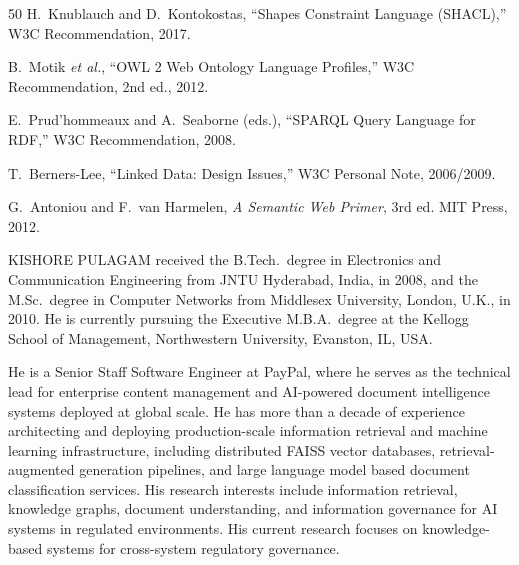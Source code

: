 \documentclass{ieeeaccess}
\begin{document}
\begin{thebibliography}{50}
H.~Knublauch and D.~Kontokostas, ``Shapes Constraint Language (SHACL),'' W3C Recommendation, 2017.

B.~Motik \textit{et al.}, ``OWL 2 Web Ontology Language Profiles,'' W3C Recommendation, 2nd ed., 2012.


E.~Prud'hommeaux and A.~Seaborne (eds.), ``SPARQL Query Language for RDF,'' W3C Recommendation, 2008.

T.~Berners-Lee, ``Linked Data: Design Issues,'' W3C Personal Note, 2006/2009.

G.~Antoniou and F.~van Harmelen, \textit{A Semantic Web Primer}, 3rd ed. MIT Press, 2012.

\end{thebibliography}

\begin{IEEEbiographynophoto}{KISHORE PULAGAM}
received the B.Tech.\ degree in Electronics and Communication Engineering from JNTU Hyderabad, India, in 2008, and the M.Sc.\ degree in Computer Networks from Middlesex University, London, U.K., in 2010. He is currently pursuing the Executive M.B.A.\ degree at the Kellogg School of Management, Northwestern University, Evanston, IL, USA.

He is a Senior Staff Software Engineer at PayPal, where he serves as the technical lead for enterprise content management and AI-powered document intelligence systems deployed at global scale. He has more than a decade of experience architecting and deploying production-scale information retrieval and machine learning infrastructure, including distributed FAISS vector databases, retrieval-augmented generation pipelines, and large language model based document classification services. His research interests include information retrieval, knowledge graphs, document understanding, and information governance for AI systems in regulated environments. His current research focuses on knowledge-based systems for cross-system regulatory governance.
\end{IEEEbiographynophoto}

\EOD
\end{document}
